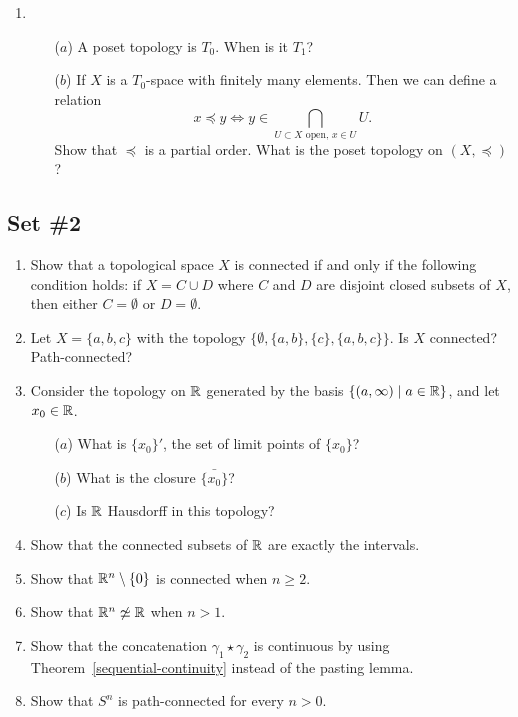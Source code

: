 \begin{enumerate}[label=1.\arabic*]
  \item \begin{itemize}
		\item[($a$)] A poset topology is $T_0$. When is it $T_1$?
		\item[($b$)] If $X$ is a $T_0$-space with finitely many elements. Then we can define a relation
		\[x\preceq y \Leftrightarrow y\in \bigcap_{U\subset X\text{ open}, \,x\in U} U.\]
		Show that $\preceq$ is a partial order. What is the poset topology on $(X,\preceq)$?
	\end{itemize}
\end{enumerate}

\subsection{Set \#2}
\begin{enumerate}[label=2.\arabic*]
  \item Show that a topological space $X$ is connected if and only if the following condition holds: if $X = C \cup D$ where $C$ and $D$ are disjoint closed subsets of $X$, then either $C = \emptyset$ or $D = \emptyset$.
  \item Let $X = \{a,b,c\}$ with the topology $\{\emptyset,\{a,b\},\{c\},\{a,b,c\}\}$. Is $X$ connected? Path-connected?
  \item Consider the topology on $\mathbb{R}$ generated by the basis $\{(a,\infty) \mid a \in \mathbb{R} \}$, and let $x_0 \in \mathbb{R}$. \begin{itemize}
    \item[($a$)] What is $\{x_0\}'$, the set of limit points of $\{x_0\}$?
    \item[($b$)] What is the closure $\bar{\{x_0\}}$?
    \item[($c$)] Is $\mathbb{R}$ Hausdorff in this topology?
  \end{itemize}
  \item \label{connected-implies-interval} Show that the connected subsets of $\mathbb{R}$ are exactly the intervals.
  \item \label{origin-removed-connected} Show that $\mathbb{R}^n \setminus \{0\}$ is connected when $n \geq 2$.
  \item \label{invariance-of-dimension-exercise} Show that $\mathbb{R}^n \not\simeq \mathbb{R}$ when $n > 1$.
  \item Show that the concatenation $\gamma_1 \star \gamma_2$ is continuous by using Theorem~\ref{sequential-continuity} instead of the pasting lemma.
  \item Show that $S^n$ is path-connected for every $n > 0$.

\end{enumerate}
